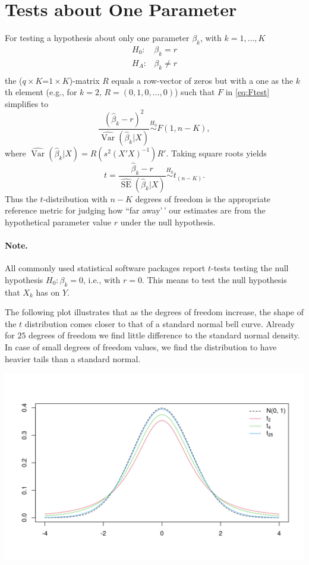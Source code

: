 \documentclass[
  14pt,
]{memoir}
\DeclareMathOperator{\V}{\operatorname{Var}}
\begin{document}
\hypertarget{ch:testingsinglep}{%
\section{Tests about One Parameter}\label{ch:testingsinglep}}

For testing a hypothesis about only one parameter \(\beta_k\), with \(k=1,\dots,K\)
\begin{equation*}
\begin{array}{ll}
H_0: & \beta_k=r\\
H_A: & \beta_k\ne r\\
\end{array}
\end{equation*}
the (\(q\times K\)=\(1\times K\))-matrix \(R\) equals a row-vector of zeros but with a one as the \(k\)th element (e.g., for \(k=2\), \(R=(0,1,0,\dots,0)\)) such that \(F\) in \eqref{eq:Ftest} simplifies to
\[
\frac{\left(\hat{\beta}_k-r\right)^2}{\widehat{\V}(\hat{\beta}_k|X)}\overset{H_0}{\sim}F(1,n-K),
\]
where \(\widehat{\V}(\hat{\beta}_k|X)=R(s^2(X'X)^{-1})R'\). Taking square roots yields
\[
t=\frac{\hat{\beta}_k-r}{\widehat{\operatorname{SE}}(\hat{\beta}_k|X)}\overset{H_0}{\sim}t_{(n-K)}.
\]
Thus the \(t\)-distribution with \(n-K\) degrees of freedom is the appropriate reference metric for judging how ``far away'\,' our estimates are from the hypothetical parameter value \(r\) under the null hypothesis.

\paragraph*{Note.}

All commonly used statistical software packages report \(t\)-tests testing the null hypothesis \(H_0:\beta_k=0\), i.e., with \(r=0\). This means to test the null hypothesis that \(X_k\) has  on \(Y\).

The following plot illustrates that as the degrees of freedom increase, the shape of the \(t\) distribution comes closer to that of a standard normal bell curve. Already for \(25\) degrees of freedom we find little difference to the standard normal density. In case of small degrees of freedom values, we find the distribution to have heavier tails than a standard normal.

\begin{center}\includegraphics[width=1\textwidth]{figure/minimal-unnamed-chunk-63-1} \end{center}
\end{document}
